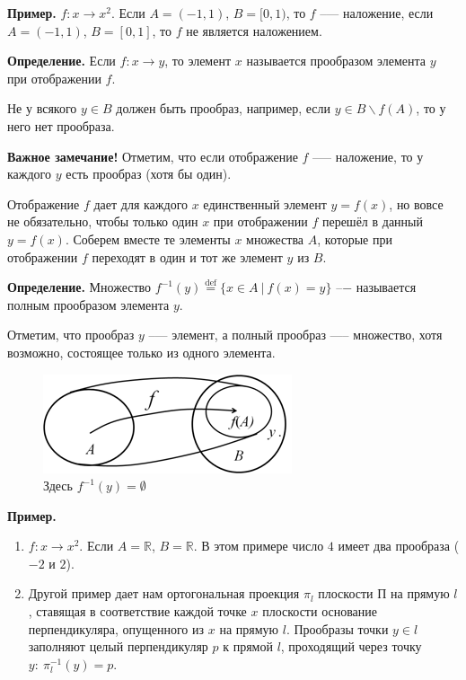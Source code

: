 \documentclass{article}
\begin{document}
    \textbf{Пример.} $f: x \rightarrow x^2$. Если $A = (-1, 1)$, $B = [0, 1)$, то $f$ --— наложение, если $A = (-1, 1)$, $B = [0, 1]$, то $f$ не является наложением.

    \textbf{Определение.} Если $f: x \rightarrow y$, то элемент $x$ называется прообразом элемента $y$ при отображении $f$.

    Не у всякого $y \in B$ должен быть прообраз, например, если $y \in B \backslash f(A)$, то у него нет прообраза.

    \textbf{Важное замечание!} Отметим, что если отображение $f$ --— наложение, то у каждого $y$ есть прообраз (хотя бы один).

    Отображение $f$ дает для каждого $x$ единственный элемент $y = f(x)$, но вовсе не обязательно, чтобы только один $x$ при отображении $f$ перешёл в данный $y = f(x)$. Соберем вместе те элементы $x$ множества $A$, которые при отображении $f$ переходят в один и тот же элемент $y$ из $B$.

    \textbf{Определение.} Множество $f^{-1}(y) \overset{\mathrm{def}}{=} \{x \in A\ |\ f(x) = y\}$ --− называется полным прообразом элемента $y$.

    Отметим, что прообраз $y$ --— элемент, а полный прообраз —-- множество, хотя возможно, состоящее только из одного элемента.

    \begin{figure}[h!]
    \centering
    \includegraphics[scale=0.75]{2_2}
    \caption{\label{fig:fig2}Здесь $f^{-1}(y) = \emptyset$}
    \end{figure}

    \textbf{Пример.}
    
    \begin{enumerate}
        \item $f: x \rightarrow x^2$. Если $A = \mathbb{R}$, $B = \mathbb{R}$. В этом примере число $4$ имеет два прообраза ($-2$ и $2$).
        \item Другой пример дает нам ортогональная проекция $\pi_l$ плоскости $\textrm{П}$ на прямую $l$, ставящая в соответствие каждой точке $x$ плоскости основание перпендикуляра, опущенного из $x$ на прямую $l$. Прообразы точки $y \in l$ заполняют целый перпендикуляр $p$ к прямой $l$, проходящий через точку $y:\ \pi_l^{-1}(y) = p$.
    \end{enumerate}
\end{document}
